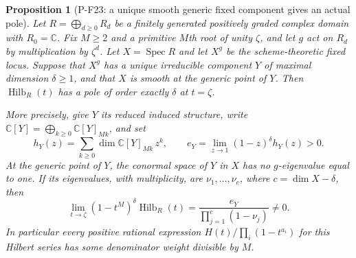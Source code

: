 \documentclass[11pt,a4paper]{article}
\newtheorem{proposition}{Proposition}[section]
\begin{document}
\begin{proposition}[P-F23: a unique smooth generic fixed component gives an actual pole]
\label{prop:fixedcomponentpole}
Let $R=\bigoplus_{d\ge0}R_d$ be a finitely generated positively
graded complex domain with $R_0=\mathbb C$. Fix $M\ge2$ and a
primitive $M$th root of unity $\zeta$, and let $g$ act on $R_d$
by multiplication by $\zeta^d$. Let $X=\operatorname{Spec}R$ and
let $X^g$ be the scheme-theoretic fixed locus. Suppose that
$X^g$ has a unique irreducible component $Y$ of maximal dimension
$\delta\ge1$, and that $X$ is smooth at the generic point of $Y$.
Then $\operatorname{Hilb}_R(t)$ has a pole of order exactly
$\delta$ at $t=\zeta$.

More precisely, give $Y$ its reduced induced structure, write
$\mathbb C[Y]=\bigoplus_{k\ge0}\mathbb C[Y]_{Mk}$, and set
\[
 h_Y(z)=\sum_{k\ge0}\dim\mathbb C[Y]_{Mk}\,z^k,
 \qquad
 e_Y=\lim_{z\to1}(1-z)^\delta h_Y(z)>0.
\]
At the generic point of $Y$, the conormal space of $Y$ in $X$
has no $g$-eigenvalue equal to one. If its eigenvalues, with
multiplicity, are $\nu_1,\ldots,\nu_c$, where
$c=\dim X-\delta$, then
\[
 \lim_{t\to\zeta}(1-t^M)^\delta\operatorname{Hilb}_R(t)
       =\frac{e_Y}{\prod_{j=1}^c(1-\nu_j)}\ne0.
 \tag{P-F23a}
\]
In particular every positive rational expression
$H(t)/\prod_i(1-t^{a_i})$ for this Hilbert series has some
denominator weight divisible by $M$.
\end{proposition}
\end{document}
